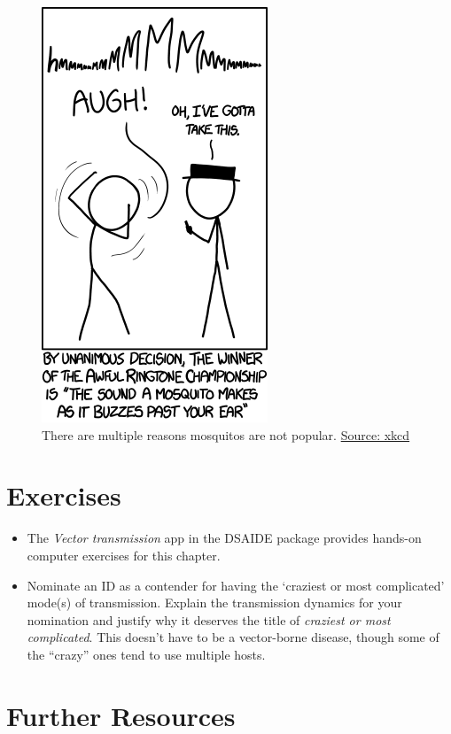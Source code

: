 \documentclass[]{book}
\providecommand{\tightlist}{%
  \setlength{\itemsep}{0pt}\setlength{\parskip}{0pt}}
\theoremstyle{definition}
\theoremstyle{definition}
\theoremstyle{definition}
\theoremstyle{remark}
\begin{document}
\begin{figure}
\centering
\includegraphics{./images/xkcd-mosquito-ringtone.png}
\caption{There are multiple reasons mosquitos are not popular.
\href{https://xkcd.com/1241/}{Source: xkcd}}
\end{figure}

\section{Exercises}\label{exercises-7}

\begin{itemize}
\tightlist
\item
  The \emph{Vector transmission} app in the DSAIDE package provides
  hands-on computer exercises for this chapter.
\item
  Nominate an ID as a contender for having the `craziest or most
  complicated' mode(s) of transmission. Explain the transmission
  dynamics for your nomination and justify why it deserves the title of
  \emph{craziest or most complicated}. This doesn't have to be a
  vector-borne disease, though some of the ``crazy'' ones tend to use
  multiple hosts.
\end{itemize}

\section{Further Resources}\label{further-resources-7}
\end{document}
